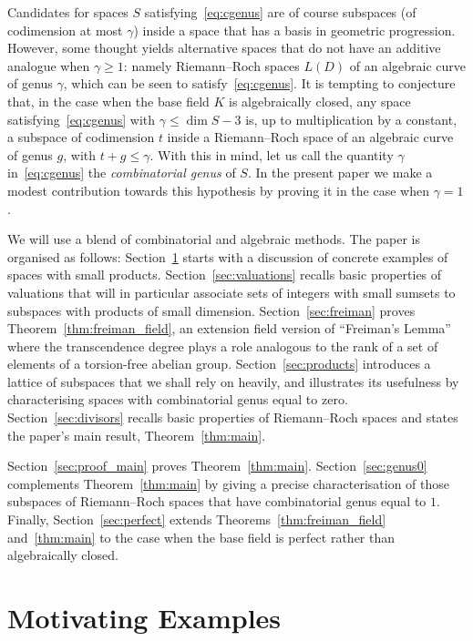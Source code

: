 \documentclass[ALCO,Unicode,ThmDefs]{cedram}
\renewcommand{\geq}{\geqslant}
\renewcommand{\leq}{\leqslant}
\begin{document}
Candidates for spaces $S$ satisfying~\eqref{eq:cgenus} are of course subspaces (of codimension at most $\gamma$) inside a space that has a basis in geometric progression. However, some thought yields alternative spaces that do not have an additive analogue when $\gamma\geq1$: namely Riemann--Roch spaces $L(D)$ of an algebraic curve of genus $\gamma$, which {can be} seen to satisfy~\eqref{eq:cgenus}. It is tempting to conjecture that, in the case when the base field $K$ is algebraically closed, any space satisfying~\eqref{eq:cgenus} {with $\gamma\leq\dim S-3$} is, up to multiplication by a constant, a subspace of codimension $t$ inside a Riemann--Roch space of an algebraic curve of genus $g$, with $t+g\leq\gamma$. With this in mind, let us call the quantity $\gamma$ in~\eqref{eq:cgenus} the \emph{combinatorial genus} of $S$. In the present paper we make a modest contribution towards this hypothesis by proving it in the case when $\gamma=1$.

We will use a blend of combinatorial and algebraic methods. The paper is organised as follows: {Section~\ref{sec:examples} starts with a discussion of concrete examples of spaces with small products.} Section~\ref{sec:valuations} recalls basic properties of valuations that will in particular associate sets of integers with small sumsets to subspaces with products of small dimension. Section~\ref{sec:freiman} proves {Theorem~\ref{thm:freiman_field}}, an extension field version of ``Freiman's Lemma'' where the transcendence degree plays a role analogous to the rank of a set of elements of a torsion-free abelian group. Section~\ref{sec:products} introduces a lattice of subspaces that we shall rely on heavily, and illustrates its usefulness by characterising spaces with combinatorial genus equal to zero. Section~\ref{sec:divisors} recalls basic properties of Riemann--Roch spaces and states the paper's main result, Theorem~\ref{thm:main}.

Section~\ref{sec:proof_main} proves Theorem~\ref{thm:main}. Section~\ref{sec:genus0} complements Theorem~\ref{thm:main} by giving a precise characterisation of those subspaces of Riemann--Roch spaces that have combinatorial genus equal to $1$. Finally, Section~\ref{sec:perfect} extends Theorems~\ref{thm:freiman_field} and~\ref{thm:main} to the case when the base field is perfect rather than algebraically closed.

\section{{Motivating Examples}}\label{sec:examples}
\end{document}
